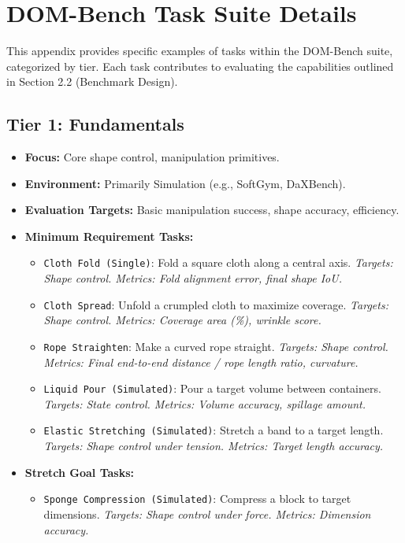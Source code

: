 \section{DOM-Bench Task Suite Details}
\label{app:task_suite} %

This appendix provides specific examples of tasks within the DOM-Bench suite, categorized by tier. Each task contributes to evaluating the capabilities outlined in Section 2.2 (Benchmark Design).

\subsection{Tier 1: Fundamentals}
\begin{itemize}
    \item \textbf{Focus:} Core shape control, manipulation primitives.
    \item \textbf{Environment:} Primarily Simulation (e.g., SoftGym, DaXBench).
    \item \textbf{Evaluation Targets:} Basic manipulation success, shape accuracy, efficiency.
    \item \textbf{Minimum Requirement Tasks:}
        \begin{itemize}
            \item \texttt{Cloth Fold (Single)}: Fold a square cloth along a central axis. \textit{Targets: Shape control. Metrics: Fold alignment error, final shape IoU.}
            \item \texttt{Cloth Spread}: Unfold a crumpled cloth to maximize coverage. \textit{Targets: Shape control. Metrics: Coverage area (\%), wrinkle score.}
            \item \texttt{Rope Straighten}: Make a curved rope straight. \textit{Targets: Shape control. Metrics: Final end-to-end distance / rope length ratio, curvature.}
            \item \texttt{Liquid Pour (Simulated)}: Pour a target volume between containers. \textit{Targets: State control. Metrics: Volume accuracy, spillage amount.}
            \item \texttt{Elastic Stretching (Simulated)}: Stretch a band to a target length. \textit{Targets: Shape control under tension. Metrics: Target length accuracy.}
        \end{itemize}
    \item \textbf{Stretch Goal Tasks:}
        \begin{itemize}
            \item \texttt{Sponge Compression (Simulated)}: Compress a block to target dimensions. \textit{Targets: Shape control under force. Metrics: Dimension accuracy.}
        \end{itemize}
\end{itemize}


